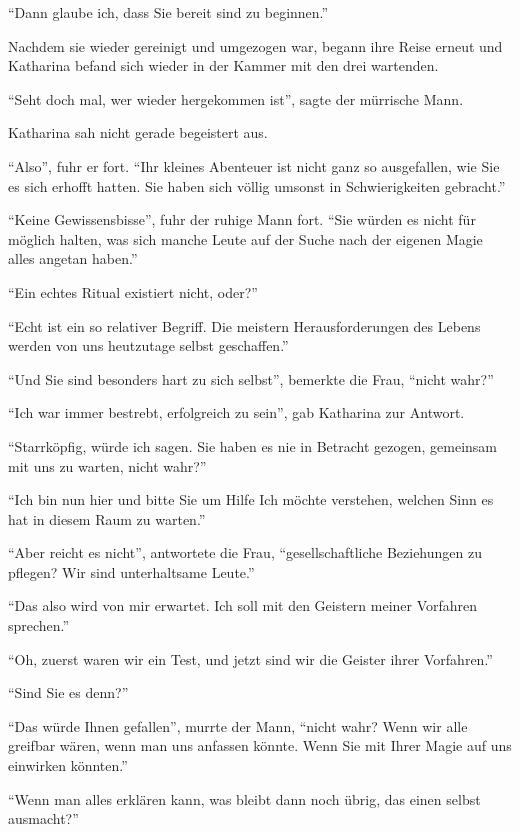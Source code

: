 \enquote{Dann glaube ich, dass Sie bereit sind zu beginnen.}

Nachdem sie wieder gereinigt und umgezogen war, begann ihre Reise erneut und Katharina befand sich wieder in der Kammer mit den drei wartenden.

\enquote{Seht doch mal, wer wieder hergekommen ist}, sagte der mürrische Mann.

Katharina sah nicht gerade begeistert aus.

\enquote{Also}, fuhr er fort. \enquote{Ihr kleines Abenteuer ist nicht ganz so ausgefallen, wie Sie es sich erhofft hatten. Sie haben sich völlig umsonst in Schwierigkeiten gebracht.}

\enquote{Keine Gewissensbisse}, fuhr der ruhige Mann fort. \enquote{Sie würden es nicht für möglich halten, was sich manche Leute auf der Suche nach der eigenen Magie alles angetan haben.}

\enquote{Ein echtes Ritual existiert nicht, oder?}

\enquote{Echt ist ein so relativer Begriff. Die meistern Herausforderungen des Lebens werden von uns heutzutage selbst geschaffen.}

\enquote{Und Sie sind besonders hart zu sich selbst}, bemerkte die Frau, \enquote{nicht wahr?}

\enquote{Ich war immer bestrebt, erfolgreich zu sein}, gab Katharina zur Antwort.

\enquote{Starrköpfig, würde ich sagen. Sie haben es nie in Betracht gezogen, gemeinsam mit uns zu warten, nicht wahr?}

\enquote{Ich bin nun hier und bitte Sie um Hilfe \gst Ich möchte verstehen, welchen Sinn es hat \gst in diesem Raum zu warten.}

\enquote{Aber reicht es nicht}, antwortete die Frau, \enquote{gesellschaftliche Beziehungen zu pflegen? Wir sind unterhaltsame Leute.}

\enquote{Das also wird von mir erwartet. Ich soll mit den Geistern meiner Vorfahren sprechen.}

\enquote{Oh, zuerst waren wir ein Test, und jetzt sind wir die Geister ihrer Vorfahren.}

\enquote{Sind Sie es denn?}

\enquote{Das würde Ihnen gefallen}, murrte der Mann, \enquote{nicht wahr? Wenn wir alle greifbar wären, wenn man uns anfassen könnte. Wenn Sie mit Ihrer Magie auf uns einwirken könnten.}

\enquote{Wenn man alles erklären kann, was bleibt dann noch übrig, das einen selbst ausmacht?}

